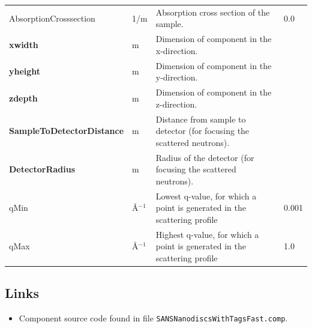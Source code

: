 \begin{longtable}{p{}p{}p{}p{}}
AbsorptionCrosssection & 1/m & Absorption cross section of the sample. & 0.0 \\
\textbf{xwidth} & m & Dimension of component in the x-direction. &  \\
\textbf{yheight} & m & Dimension of component in the y-direction. &  \\
\textbf{zdepth} & m & Dimension of component in the z-direction. &  \\
\textbf{SampleToDetectorDistance} & m & Distance from sample to detector (for focusing the scattered neutrons). &  \\
\textbf{DetectorRadius} & m & Radius of the detector (for focusing the scattered neutrons). &  \\
qMin & \AA{}$^{-1}$ & Lowest q-value, for which a point is generated in the scattering profile & 0.001 \\
qMax & \AA{}$^{-1}$ & Highest q-value, for which a point is generated in the scattering profile & 1.0 \\
\bottomrule
\end{longtable}

\subsection*{Links}
\begin{itemize}
  \item Component source code found in file \texttt{SANSNanodiscsWithTagsFast.comp}.
\end{itemize}
